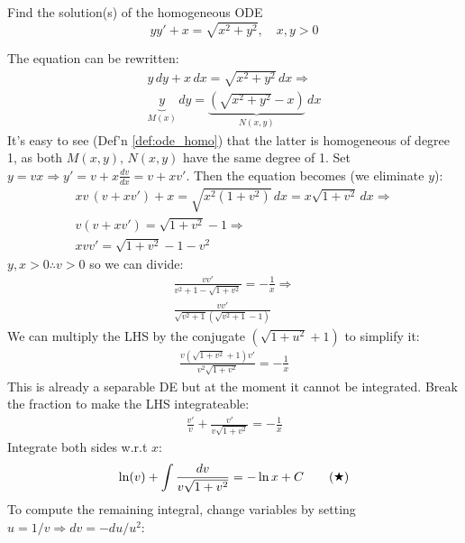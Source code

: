 \documentclass[a4paper]{article}
\begin{document}
\begin{exmp}
    Find the solution(s) of the homogeneous ODE  
\[
    yy' + x = \sqrt{x^2 + y^2}, \quad x, y > 0
\]
\end{exmp}
\begin{soln}
    The equation can be rewritten:
    \begin{gather*}
        y\, dy + x\, dx = \sqrt{x^2 + y^2} \, dx \Rightarrow \\
        \underbrace{y}_{M(x)}\, dy = \underbrace{(\sqrt{x^2 + y^2} - x)}_{N(x,y)}\, dx
    \end{gather*}
    It's easy to see (Def'n \ref{def:ode_homo}) that the latter is homogeneous of degree 1, as both $M(x,y), \, N(x,y)$ have the same degree of 1. Set $y=vx \Rightarrow y' = v + x \tfrac{dv}{dx} = v+xv'$. Then the equation becomes (we eliminate $y$):
    \begin{gather*}
        xv \, \left(v + x v'\right)  + x = \sqrt{x^2(1+v^2)}\, dx = x\sqrt{1+v^2} \, dx \Rightarrow \\
        v\left(v + xv'\right) = \sqrt{1 + v^2} - 1 \Rightarrow \\
        xvv' = \sqrt{1 + v^2} - 1 - v^2
    \end{gather*}
    $y,x > 0 \therefore v > 0$ so we can divide:
    \begin{gather*}
        \frac{vv'}{v^2 + 1 - \sqrt{1 + v^2}}  = -\frac{1}{x}  \Rightarrow \\
        \frac{vv'}{\sqrt{v^2 + 1}(\sqrt{v^2 + 1} -1)}
    \end{gather*}
    We can multiply the LHS by the conjugate $(\sqrt{1+u^2} + 1)$ to simplify it:
    \begin{gather*}
        \frac{v(\sqrt{1+v^2} + 1)v'}{v^2\sqrt{1+v^2}} = -\frac{1}{x}   
    \end{gather*}
    This is already  a separable DE but at the moment it cannot be integrated. Break the fraction to make the LHS integrateable:
    \begin{gather*}
        \frac{v'}{v} + \frac{v'}{v\sqrt{1+v^2}} = -\frac{1}{x}  
    \end{gather*}
    Integrate both sides w.r.t $x$:
    \begin{gather*}
        \ln(v) + \int \frac{dv}{v\sqrt{1+v^2}} = -\ln x + C 
        \tag{\ding{72}}
        \label{eq:ode_hom_ex1}
    \end{gather*}
    To compute the remaining integral, change variables by setting $u = 1/v \Rightarrow dv = -du/u^2$:

\end{soln}
\end{document}
